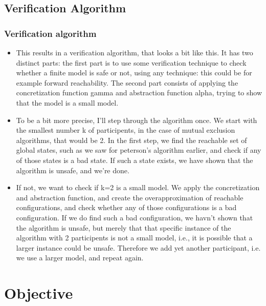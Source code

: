 \documentclass[handout]{beamer}
\begin{document}
\begin{footnotesize}
\subsection{Verification Algorithm}
\begin{frame}
  \frametitle{Verification algorithm} %
\begin{itemize}
\item
This results in a verification algorithm, that looks a bit like this. It has two distinct parts: the first part is to use some verification technique to check whether a finite model is safe or not, using any technique: this could be for example forward reachability. The second part consists of applying the concretization function gamma and abstraction function alpha, trying to show that the model is a small model.
\item
To be a bit more precise, I'll step through the algorithm once. We start with the smallest number k of participents, in the case of mutual exclusion algorithms, that would be 2. In the first step, we find the reachable set of global states, such as we saw for peterson's algorithm earlier, and check if any of those states is a bad state. If such a state exists, we have shown that the algorithm is unsafe, and we're done.
\item
If not, we want to check if k=2 is a small model. We apply the concretization and abstraction function, and create the overapproximation of reachable configurations, and check whether any of those configurations is a bad configuration. If we do find such a bad configuration, we havn't shown that the algorithm is unsafe, but merely that that specific instance of the algorithm with 2 participents is not a small model, i.e., it is possible that a larger instance could be unsafe. Therefore we add yet another participant, i.e. we use a larger model, and repeat again.
\end{itemize}

\end{frame}

\section{Objective}

\end{footnotesize}
\end{document}
